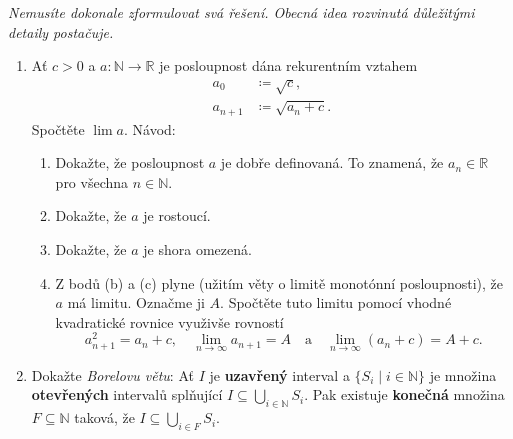 \documentclass[a4paper,11pt]{article}
\newcommand{\R}{\mathbb{R}}
\newcommand{\N}{\mathbb{N}}
\begin{document}
 \begin{tcolorbox}[breakable,title=\textsf{Těžké úlohy a důkazy (12
  bodů)},arc=0mm,boxsep=3mm,bottomrule=1pt,toprule=1pt,leftrule=-0.1mm,
  rightrule=-0.1mm,colframe=BrickRed!80!white,colback=BrickRed!5!white]
  \emph{Nemusíte dokonale zformulovat svá řešení. Obecná idea rozvinutá
  důležitými detaily postačuje.}
  \begin{enumerate}
   \item Ať $c > 0$ a $a:\N \to \R$ je posloupnost dána rekurentním vztahem
   \begin{align*}
    a_0 & \coloneqq \sqrt{c},\\
    a_{n+1} & \coloneqq \sqrt{a_n + c}.
   \end{align*}
   Spočtěte $\lim a$. Návod:
   \begin{enumerate}
    \item Dokažte, že posloupnost $a$ je dobře definovaná. To znamená, že $a_n
     \in \R$ pro všechna $n \in \N$.
    \item Dokažte, že $a$ je rostoucí.
    \item Dokažte, že $a$ je shora omezená.
    \item Z bodů (b) a (c) plyne (užitím věty o limitě monotónní posloupnosti),
     že $a$ má limitu. Označme ji $A$. Spočtěte tuto limitu pomocí vhodné
     kvadratické rovnice využivše rovností
     \[
      a^2_{n+1} = a_n + c, \quad \lim_{n \to \infty} a_{n+1} = A \quad \text{a}
      \quad \lim_{n \to \infty} (a_n + c) = A + c.
     \]
   \end{enumerate}
  \item Dokažte \emph{Borelovu větu}: Ať $I$ je \textbf{uzavřený} interval a
   $\{S_i \mid i \in \N\}$ je množina \textbf{otevřených} intervalů splňující $I
   \subseteq \bigcup_{i \in \N} S_i$. Pak existuje \textbf{konečná} množina $F
   \subseteq \N$ taková, že $I \subseteq \bigcup_{i \in F} S_i$.


\end{enumerate}
\end{tcolorbox}
\end{document}
